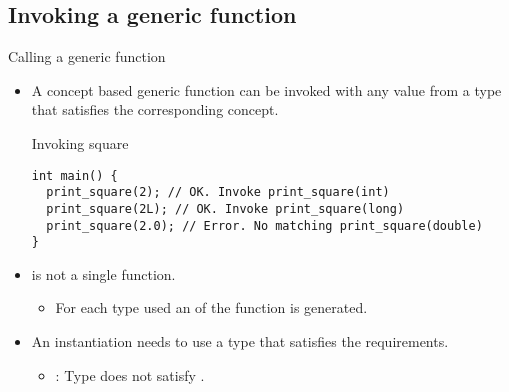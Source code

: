 \subsection{Invoking a generic function} 

\begin{frame}[t,fragile]{Calling a generic function}
\begin{itemize}
  \item A concept based generic function can be invoked with any value from
        a type that satisfies the corresponding concept.
\begin{block}{Invoking square}
\begin{lstlisting}
int main() {
  print_square(2); // OK. Invoke print_square(int)
  print_square(2L); // OK. Invoke print_square(long)
  print_square(2.0); // Error. No matching print_square(double)
}
\end{lstlisting}
\end{block}

  \item {} is not a single function.
    \begin{itemize}
      \item For each type used an  of the function is generated.
    \end{itemize}

  \item An instantiation needs to use a type that satisfies the requirements.
    \begin{itemize}
      \item {}: Type  does not satisfy .
    \end{itemize}
\end{itemize}

\end{frame}
